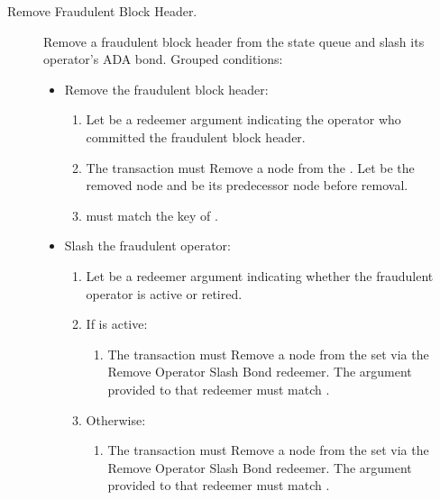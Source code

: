 \documentclass[../midgard.tex]{subfiles}
\begin{document}
\begin{description}
    \item[Remove Fraudulent Block Header.] Remove a fraudulent block header from the state queue and slash its operator's ADA bond.
      Grouped conditions:
    \begin{itemize}
        \item Remove the fraudulent block header:
        \begin{enumerate}
            \item Let  be a redeemer argument indicating the operator who committed the fraudulent block header.
            \item The transaction must Remove a node from the .
              Let  be the removed node and  be its predecessor node before removal.
            \item {} must match the key of .
        \end{enumerate}

        \item Slash the fraudulent operator:
        \begin{enumerate}[resume]
            \item Let  be a redeemer argument indicating whether the fraudulent operator is active or retired.
            \item If  is active:
                \begin{enumerate}
                    \item The transaction must Remove a node from the  set via the Remove Operator Slash Bond redeemer.
                      The  argument provided to that redeemer must match .
                \end{enumerate}
            \item Otherwise:
                \begin{enumerate}
                    \item The transaction must Remove a node from the  set via the Remove Operator Slash Bond redeemer.
                      The  argument provided to that redeemer must match .
                \end{enumerate}
        \end{enumerate}


\end{itemize}
\end{description}
\end{document}
